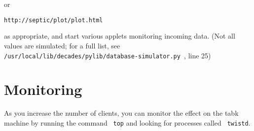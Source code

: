or

\texttt{http://septic/plot/plot.html}

as appropriate, and start various applets monitoring incoming data. (Not all values are simulated; for a full list, see \texttt{ /usr/local/lib/decades/pylib/database-simulator.py }, line 25)

\section{Monitoring}
As you increase the number of clients, you can monitor the effect on the tabk machine by running the command \texttt{ top} and looking for processes called \texttt{ twistd}.

\newpage
